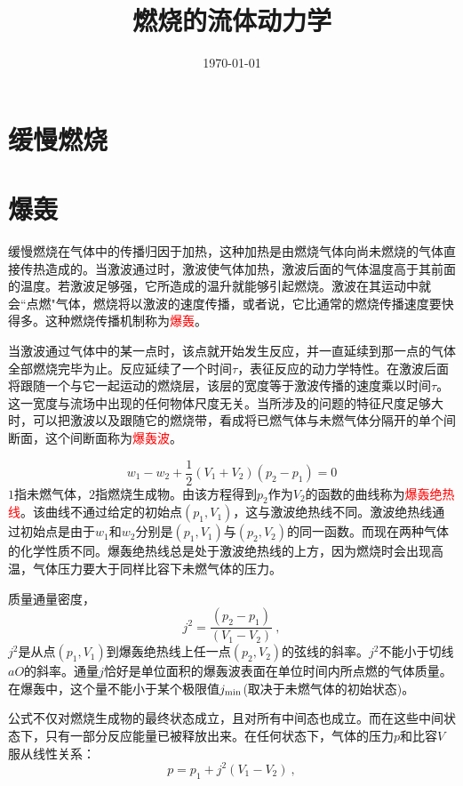 \documentclass[12pt,a4paper]{article}
\title{燃烧的流体动力学}
\author{}
\date{\today}
\begin{document}
\maketitle
\section{缓慢燃烧}





\section{爆轰}
缓慢燃烧在气体中的传播归因于加热，这种加热是由燃烧气体向尚未燃烧的气体直接传热造成的。当激波通过时，激波使气体加热，激波后面的气体温度高于其前面的温度。若激波足够强，它所造成的温升就能够引起燃烧。激波在其运动中就会``点燃"气体，燃烧将以激波的速度传播，或者说，它比通常的燃烧传播速度要快得多。这种燃烧传播机制称为\textcolor{red}{爆轰}。

当激波通过气体中的某一点时，该点就开始发生反应，并一直延续到那一点的气体全部燃烧完毕为止。反应延续了一个时间$\tau$，表征反应的动力学特性。在激波后面将跟随一个与它一起运动的燃烧层，该层的宽度等于激波传播的速度乘以时间$\tau$。这一宽度与流场中出现的任何物体尺度无关。当所涉及的问题的特征尺度足够大时，可以把激波以及跟随它的燃烧带，看成将已燃气体与未燃气体分隔开的单个间断面，这个间断面称为\textcolor{red}{爆轰波}。	

\begin{equation}
w_1 - w_2 +\dfrac{1}{2}(V_1 +V_2)(p_2 -p_1) = 0
\end{equation}
$1$指未燃气体，$2$指燃烧生成物。由该方程得到$p_2$作为$V_2$的函数的曲线称为\textcolor{red}{爆轰绝热线}。该曲线不通过给定的初始点$(p_1, V_1)$，这与激波绝热线不同。激波绝热线通过初始点是由于$w_1$和$w_2$分别是$(p_1, V_1)$与$(p_2, V_2)$的同一函数。而现在两种气体的化学性质不同。爆轰绝热线总是处于激波绝热线的上方，因为燃烧时会出现高温，气体压力要大于同样比容下未燃气体的压力。

质量通量密度，
\begin{equation}
j^2 = \dfrac{(p_2 -p_1)}{(V_1 -V_2)} ~,
\end{equation}
$j^2$是从点$(p_1, V_1)$到爆轰绝热线上任一点$(p_2, V_2)$的弦线的斜率。$j^2$不能小于切线$aO$的斜率。通量$j$恰好是单位面积的爆轰波表面在单位时间内所点燃的气体质量。在爆轰中，这个量不能小于某个极限值$j_{\rm min}$(取决于未燃气体的初始状态)。

公式不仅对燃烧生成物的最终状态成立，且对所有中间态也成立。而在这些中间状态下，只有一部分反应能量已被释放出来。在任何状态下，气体的压力$p$和比容$V$服从线性关系：
\begin{equation}
p = p_1 +j^2 (V_1 -V_2) ~,
\end{equation}
\end{document}
